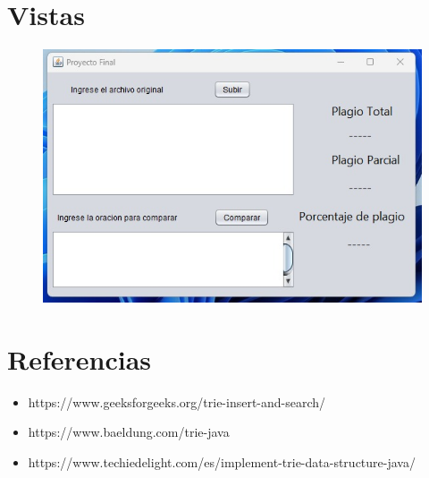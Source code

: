 \section{Vistas}

\begin{figure}[h!]
    \centering
    \includegraphics[scale=0.6]{img/caos.jpeg}
\end{figure}


\section{Referencias}

\begin{itemize}
    \item https://www.geeksforgeeks.org/trie-insert-and-search/
    \item https://www.baeldung.com/trie-java
    \item https://www.techiedelight.com/es/implement-trie-data-structure-java/
\end{itemize}

